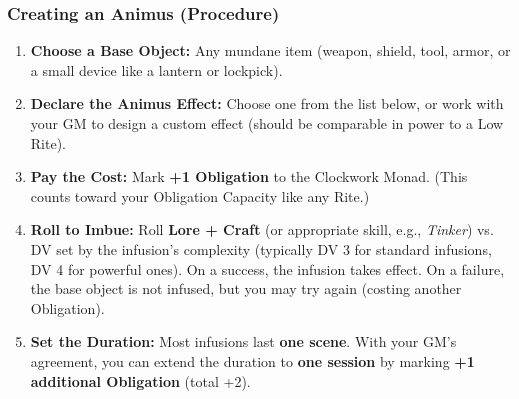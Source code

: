 \subsubsection*{Creating an Animus (Procedure)}
\begin{enumerate}
  \item \textbf{Choose a Base Object:} Any mundane item (weapon, shield, tool, armor, or a small device like a lantern or lockpick).
  \item \textbf{Declare the Animus Effect:} Choose one from the list below, or work with your GM to design a custom effect (should be comparable in power to a Low Rite).
  \item \textbf{Pay the Cost:} Mark \textbf{+1 Obligation} to the Clockwork Monad. (This counts toward your Obligation Capacity like any Rite.)
  \item \textbf{Roll to Imbue:} Roll \textbf{Lore + Craft} (or appropriate skill, e.g., \textit{Tinker}) vs. DV set by the infusion's complexity (typically DV 3 for standard infusions, DV 4 for powerful ones). On a success, the infusion takes effect. On a failure, the base object is not infused, but you may try again (costing another Obligation).
  \item \textbf{Set the Duration:} Most infusions last \textbf{one scene}. With your GM's agreement, you can extend the duration to \textbf{one session} by marking \textbf{+1 additional Obligation} (total +2).
\end{enumerate}

